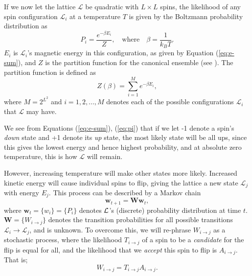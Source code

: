 \documentclass[]{article}
\begin{document}
If we now let the lattice $\mathcal{L}$ be quadratic with $L \times L$ spins, the likelihood of any spin configuration $\mathcal{L}_i$ at a temperature $T$ is given by the Boltzmann probability distribution as
\begin{equation} \label{eq:pi}
	P_i = \frac{e^{-\beta E_i}}{Z}, \quad \text{where} \quad \beta = \frac{1}{k_BT}.
\end{equation}
$E_i$ is $\mathcal{L}_i$'s magnetic energy in this configuration, as given by Equation (\ref{eq:e-sum}), and $Z$ is the partition function for the canonical ensemble (see \cite{fys4150-notes}). The partition function is defined as
\begin{equation} \label{eq:partition-function}
	Z(\beta) = \sum_{i=1}^{M} e^{-\beta E_i},
\end{equation}
where $M = 2^{L^2}$ and $i = 1,2,...,M$ denotes each of the possible configurations $\mathcal{L}_i$ that $\mathcal{L}$ may have.

We see from Equations (\ref{eq:e-sum}), (\ref{eq:pi}) that if we let -1 denote a spin's \textit{down} state and +1 denote its \textit{up} state, the most likely state will be all ups, since this gives the lowest energy and hence highest probability, and at absolute zero temperature, this is how $\mathcal{L}$ will remain. 

However, increasing temperature will make other states more likely. Increased kinetic energy will cause individual spins to flip, giving the lattice a new state $\mathcal{L}_j$ with energy $E_j$. This process can be described by a Markov chain
\begin{equation} \label{eq:markov-chain}
	\mathbf{w}_{t+1} = \mathbf{W} \mathbf{w}_{t},
\end{equation}
where $\mathbf{w}_t = \{w_i\} = \{P_i\}$ denotes $\cal{L}$'s (discrete) probability distribution at time $t$. $\mathbf{W} = \{W_{i \rightarrow j}\}$ denotes the transition probabilities for all possible transitions $\mathcal{L}_i \rightarrow \mathcal{L}_j$, and is unknown. To overcome this, we will re-phrase $W_{i \rightarrow j}$ as a stochastic process, where the likelihood $T_{i \rightarrow j}$ of a spin to be a \textit{candidate} for the flip is equal for all, and the likelihood that we \textit{accept} this spin to flip is $A_{i \rightarrow j}$. That is;
\begin{equation}
	W_{i \rightarrow j} = T_{i \rightarrow j} A_{i \rightarrow j}.
\end{equation}
\end{document}
